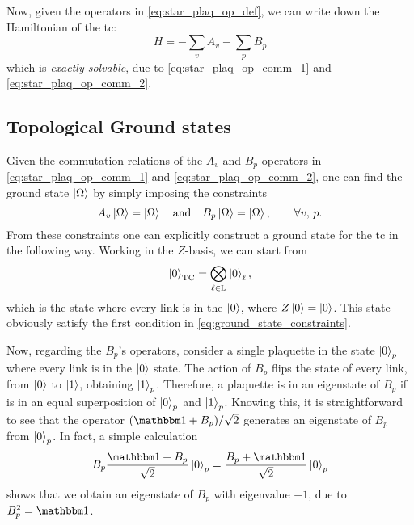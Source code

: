 Now, given the operators in \eqref{eq:star_plaq_op_def}, we can write down the Hamiltonian of the \ac{tc}:
\begin{equation}
    H = - \sum_{v} A_v - \sum_{p} B_p
    \label{eq:toric_code_hamiltonian}
\end{equation}
which is \emph{exactly solvable}, due to \eqref{eq:star_plaq_op_comm_1} and \eqref{eq:star_plaq_op_comm_2}.


\begin{figure}[t]
\end{figure}



%
%
\subsection{Topological Ground states}
\label{sub:topological_ground_states}

Given the commutation relations of the $A_v$ and $B_p$ operators in \eqref{eq:star_plaq_op_comm_1} and \eqref{eq:star_plaq_op_comm_2}, one can find the ground state $\ket{\Omega}$ by simply imposing the constraints
\begin{equation}
    A_v \ket{\Omega} = \ket{\Omega} \qand
    B_p \ket{\Omega} = \ket{\Omega}, \qquad \forall v,\, p.
    \label{eq:ground_state_constraints}
\end{equation}
From these constraints one can explicitly construct a ground state for the \ac{tc} in the following way.
Working in the $Z$-basis, we can start from
\begin{equation}
    \ket{0}_{\text{TC}} = \bigotimes_{\ell \in \mathbb{L}} \ket{0}_{\ell},
\end{equation}
which is the state where every link is in the $\ket{0}$, where $Z \ket{0} = \ket{0}$.
This state obviously satisfy the first condition in \eqref{eq:ground_state_constraints}.

Now, regarding the $B_p$'s operators, consider a single plaquette in the state $\ket{0}_p$ where every link is in the $\ket{0}$ state.
The action of $B_p$ flips the state of every link, from $\ket{0}$ to $\ket{1}$, obtaining $\ket{1}_p$.
Therefore, a plaquette is in an eigenstate of $B_p$ if is in an equal superposition of $\ket{0}_p$ and $\ket{1}_p$.
Knowing this, it is straightforward to see that the operator $(\identity + B_p)/\sqrt{2}$ generates an eigenstate of $B_p$ from $\ket{0}_p$.
In fact, a simple calculation
\begin{equation}
    B_p \frac{\identity + B_p}{\sqrt{2}} \ket{0}_p = \frac{B_p + \identity}{\sqrt{2}} \ket{0}_p
\end{equation}
shows that we obtain an eigenstate of $B_p$ with eigenvalue $+1$, due to $B_p^2 = \identity$.

